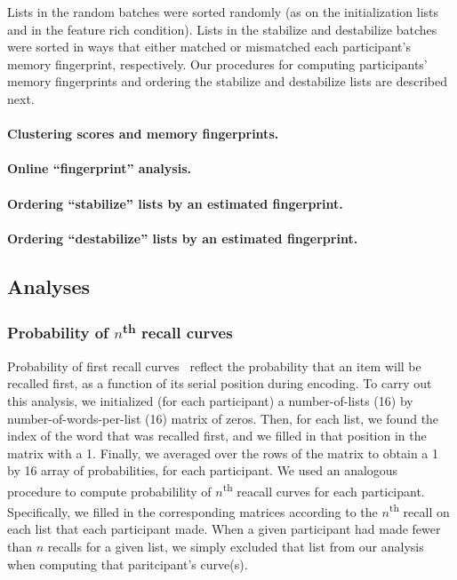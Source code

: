 \documentclass[11pt]{article}
\begin{document}
Lists in the random batches were sorted randomly (as on the initialization
lists and in the feature rich condition). Lists in the stabilize and
destabilize batches were sorted in ways that either matched or mismatched each
participant's memory fingerprint, respectively. Our procedures for computing
participants' memory fingerprints and ordering the stabilize and destabilize
lists are described next.

\paragraph*{Clustering scores and memory fingerprints.}

\paragraph{Online ``fingerprint'' analysis.}

\paragraph{Ordering ``stabilize'' lists by an estimated fingerprint.}

\paragraph{Ordering ``destabilize'' lists by an estimated fingerprint.}

\subsection*{Analyses}

\subsubsection*{Probability of $n$\textsuperscript{th} recall curves}

Probability of first recall curves~\citep{AtkiShif68, PostPhil65, WelcBurn24}
reflect the probability that an item will be recalled first, as a function of
its serial position during encoding. To carry out this analysis, we initialized (for each participant)
a number-of-lists (16) by number-of-words-per-list (16) matrix of zeros.
Then, for each list, we found the index of the word that was recalled first, and we filled in that
position in the matrix with a 1.  Finally, we averaged over the rows of the matrix to obtain a 1 by 16 array of
probabilities, for each participant.  We used an analogous procedure to compute probabilility of $n$\textsuperscript{th}
reacall curves for each participant.  Specifically, we filled in the corresponding matrices according to the $n$\textsuperscript{th}
recall on each list that each participant made.  When a given participant had made fewer than $n$ recalls for a given list,
we simply excluded that list from our analysis when computing that paritcipant's curve(s).
\end{document}

